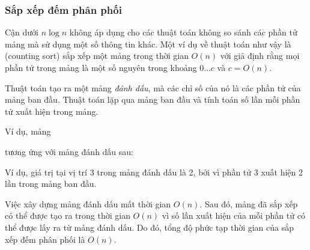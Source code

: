 \subsubsection{Sắp xếp đếm phân phối}


Cận dưới $n \log n$ không áp dụng cho
các thuật toán không so sánh các phần tử mảng
mà sử dụng một số thông tin khác.
Một ví dụ về thuật toán như vậy là
 (counting sort) sắp xếp một mảng trong
thời gian $O(n)$ với giả định rằng mọi phần tử trong mảng
là một số nguyên trong khoảng $0 \ldots c$ và $c=O(n)$.

Thuật toán tạo ra một mảng \emph{đánh dấu},
mà các chỉ số của nó là các phần tử của mảng ban đầu.
Thuật toán lặp qua mảng ban đầu
và tính toán số lần mỗi phần tử
xuất hiện trong mảng.

Ví dụ, mảng
\begin{center}
\end{center}
tương ứng với mảng đánh dấu sau:
\begin{center}
\end{center}

Ví dụ, giá trị tại vị trí 3
trong mảng đánh dấu là 2,
bởi vì phần tử 3 xuất hiện 2 lần
trong mảng ban đầu.

Việc xây dựng mảng đánh dấu
mất thời gian $O(n)$. Sau đó, mảng đã sắp xếp
có thể được tạo ra trong thời gian $O(n)$ vì
số lần xuất hiện của mỗi phần tử có thể được lấy ra
từ mảng đánh dấu.
Do đó, tổng độ phức tạp thời gian của sắp xếp đếm phân phối
là $O(n)$.

